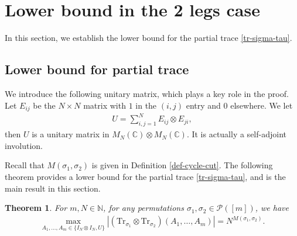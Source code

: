 \documentclass[12pt]{article}
\numberwithin{equation}{section}
\theoremstyle{plain}
\newtheorem{theorem}{Theorem}[section]
\def\bN{\mathbb N}
\def\bC{\mathbb C}
\def\cP{\mathcal P}
\def\Tr{\mathrm {Tr}}
\begin{document}
\section{Lower bound in the 2 legs case} \label{sec:lower}

In this section, we establish the lower bound for the partial trace \eqref{tr-sigma-tau}.

\subsection{Lower bound for partial trace}

We introduce the following unitary matrix, which plays a key role in the proof.
Let $E_{ij}$ be the $N \times N$ matrix with $1$ in the $(i,j)$ entry and $0$ elsewhere. We let
\begin{align*}
    U = \sum_{i,j=1}^N E_{ij} \otimes E_{ji},
\end{align*}
then $U$ is a unitary matrix in $M_N(\bC) \otimes M_N(\bC)$.
It is actually a self-adjoint involution.

Recall that $M(\sigma_1,\sigma_2)$ is given in Definition \ref{def-cycle-cut}. The following theorem provides a lower bound for the partial trace \eqref{tr-sigma-tau}, and is the main result in this section.

\begin{theorem} \label{Thm-lower}
For $m,N \in \bN$, for any permutations $\sigma_1,\sigma_2 \in \cP([m])$, we have
\begin{align*}
    \max_{A_1,\ldots,A_m \in \{I_N \otimes I_N, U\}} \left| \left( \Tr_{\sigma_1} \otimes \Tr_{\sigma_2} \right) \left( A_1, \ldots, A_m \right) \right|
    = N^{M(\sigma_1,\sigma_2)}.
\end{align*}
\end{theorem}
\end{document}
